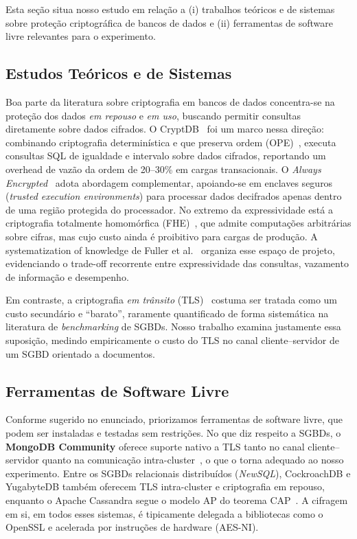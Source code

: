 \documentclass[12pt]{article}
\begin{document}
Esta seção situa nosso estudo em relação a (i) trabalhos teóricos e de sistemas
sobre proteção criptográfica de bancos de dados e (ii) ferramentas de software
livre relevantes para o experimento.

\subsection{Estudos Teóricos e de Sistemas}
\label{sec:rel-teoria}

Boa parte da literatura sobre criptografia em bancos de dados concentra-se na
proteção dos dados \emph{em repouso} e \emph{em uso}, buscando permitir consultas
diretamente sobre dados cifrados. O CryptDB~\cite{popa2011cryptdb} foi um marco
nessa direção: combinando criptografia determinística e que preserva ordem
(OPE)~\cite{boldyreva2009ope}, executa consultas SQL de igualdade e intervalo
sobre dados cifrados, reportando um overhead de vazão da ordem de 20--30\% em
cargas transacionais. O \emph{Always Encrypted}~\cite{antonopoulos2020alwaysencrypted}
adota abordagem complementar, apoiando-se em enclaves seguros (\emph{trusted
execution environments}) para processar dados decifrados apenas dentro de uma
região protegida do processador. No extremo da expressividade está a criptografia
totalmente homomórfica (FHE)~\cite{gentry2009fhe}, que admite computações
arbitrárias sobre cifras, mas cujo custo ainda é proibitivo para cargas de
produção. A systematization of knowledge de Fuller et
al.~\cite{fuller2017sok} organiza esse espaço de projeto, evidenciando o
trade-off recorrente entre expressividade das consultas, vazamento de informação
e desempenho.

Em contraste, a criptografia \emph{em trânsito} (TLS)~\cite{rescorla2018tls}
costuma ser tratada como um custo secundário e ``barato'', raramente
quantificado de forma sistemática na literatura de \emph{benchmarking} de SGBDs.
Nosso trabalho examina justamente essa suposição, medindo empiricamente o custo
do TLS no canal cliente--servidor de um SGBD orientado a documentos.

\subsection{Ferramentas de Software Livre}
\label{sec:rel-ferramentas}

Conforme sugerido no enunciado, priorizamos ferramentas de software livre, que
podem ser instaladas e testadas sem restrições. No que diz respeito a SGBDs, o
\textbf{MongoDB Community} oferece suporte nativo a TLS tanto no canal
cliente--servidor quanto na comunicação intra-cluster~\cite{mongodb-tls}, o que o
torna adequado ao nosso experimento. Entre os SGBDs relacionais distribuídos
(\emph{NewSQL}), CockroachDB e YugabyteDB também oferecem TLS intra-cluster e
criptografia em repouso, enquanto o Apache Cassandra segue o modelo AP do teorema
CAP~\cite{gilbert2002cap}. A cifragem em si, em todos esses sistemas, é
tipicamente delegada a bibliotecas como o OpenSSL e acelerada por instruções de
hardware (AES-NI).
\end{document}
